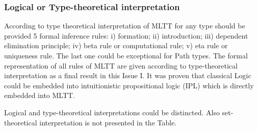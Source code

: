 \documentclass{article}
\theoremstyle{definition}
\begin{document}
\subsubsection{Logical or Type-theoretical interpretation}

According to type theoretical interpretation of MLTT for any type should be provided 5 formal
inference rules: i) formation; ii) introduction; iii) dependent elimination principle;
iv) beta rule or computational rule; v) eta rule or uniqueness rule. The last one could
be exceptional for Path types. The formal representation of all rules of MLTT
are given according to type-theoretical interpretation as a final result in this Issue I.
It was proven that classical Logic could be embedded into
intuitionistic propositional logic (IPL) which is directly embedded into MLTT.

Logical and type-theoretical interpretations could be distincted. Also
set-theoretical interpretation is not presented in the Table.
\end{document}
